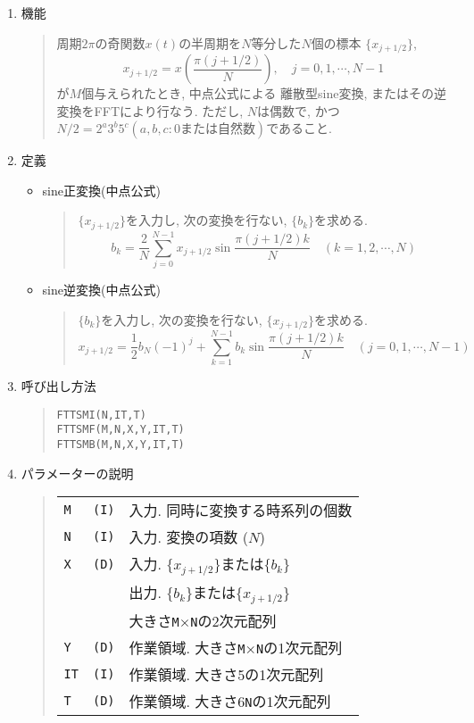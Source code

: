 \documentclass[a4j]{jarticle}
\newcommand{\ttM}{{\tt M}}
\newcommand{\ttN}{{\tt N}}
\begin{document}
\begin{enumerate}

  \item 機能 
  \begin{quote}
    周期$2\pi$の奇関数$x(t)$の半周期を$N$等分した$N$個の標本
    $\{x_{j+1/2}\}$,
     $$x_{j+1/2}=x(\frac{\pi(j+1/2)}N), \quad j=0,1,\cdots,N-1 $$
    が$M$個与えられたとき, 中点公式による
    離散型sine変換, またはその逆変換をFFTにより行なう. ただし, 
    $N$は偶数で, かつ$N/2=2^a3^b5^c(a,b,c: 0または自然数)$であること.
  \end{quote}

  \item 定義
    \begin{itemize}
     \item sine正変換(中点公式)
      \begin{quote}
       $\{x_{j+1/2}\}$を入力し, 次の変換を行ない, $\{b_k\}$を求める.
       $$b_k= \frac2N
              \sum^{N-1}_{j=0}x_{j+1/2}\sin\frac{\pi(j+1/2)k}N
       \quad (k=1,2,\cdots,N)$$
      \end{quote}

     \item sine逆変換(中点公式)
      \begin{quote}
       $\{b_k\}$を入力し, 次の変換を行ない, $\{x_{j+1/2}\}$を求める.
       $$x_{j+1/2}=\frac12 b_N(-1)^j
              +\sum^{N-1}_{k=1}b_k\sin\frac{\pi(j+1/2)k}N
       \quad (j=0,1,\cdots,N-1)$$
      \end{quote}
     \end{itemize}    

  \item 呼び出し方法 
  \begin{quote}
    {\tt FTTSMI(N,IT,T)}\\
    {\tt FTTSMF(M,N,X,Y,IT,T)}\\
    {\tt FTTSMB(M,N,X,Y,IT,T)}
  \end{quote}
  \item パラメーターの説明 
  \begin{quote}
    \begin{tabular}{llp{10cm}}
      {\tt M }&{\tt (I)}& 入力. 同時に変換する時系列の個数\\
      {\tt N }&{\tt (I)}& 入力. 変換の項数 ($N$)\\
      {\tt X }   & {\tt (D)} & 入力. $\{x_{j+1/2}\}$または$\{b_k\}$\\
                 &           & 出力. $\{b_k\}$または$\{x_{j+1/2}\}$\\
                 &           & 大きさ\ttM$\times$\ttN の2次元配列\\
      {\tt Y }   & {\tt (D)} & 作業領域. 大きさ\ttM$\times$\ttN の1次元配列\\
      {\tt IT}   & {\tt (I)} & 作業領域. 大きさ5の1次元配列\\
      {\tt T }   & {\tt (D)} & 作業領域. 大きさ6\ttN の1次元配列
    \end{tabular}
  \end{quote}


\end{enumerate}
\end{document}
